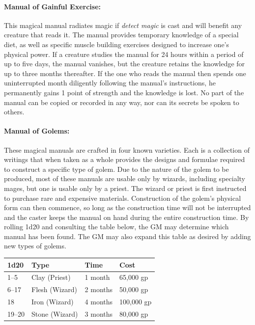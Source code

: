 \begin{multicols}{2}
\paragraph{Manual of Gainful Exercise:} This magical manual radiates magic if \textit{detect magic} is cast and will benefit any creature that reads it.  The manual provides temporary knowledge of a special diet, as well as specific muscle building exercises designed to increase one's physical power.  If a creature studies the manual for 24 hours within a period of up to five days, the manual vanishes, but the creature retains the knowledge for up to three months thereafter.  If the one who reads the manual then spends one uninterrupted month diligently following the manual's instructions, he permanently gains 1 point of strength and the knowledge is lost.  No part of the manual can be copied or recorded in any way, nor can its secrets be spoken to others.  

\paragraph{Manual of Golems:} These magical manuals are crafted in four known varieties.  Each is a collection of writings that when taken as a whole provides the designs and formulae required to construct a specific type of golem.  Due to the nature of the golem to be produced, most of these manuals are usable only by wizards, including specialty mages, but one is usable only by a priest.  The wizard or priest is first instructed to purchase rare and expensive materials.  Construction of the golem's physical form can then commence, so long as the construction time will not be interrupted and the caster keeps the manual on hand during the entire construction time.  By rolling 1d20 and consulting the table below, the GM may determine which manual has been found.  The GM may also expand this table as desired by adding new types of golems.
 
\noindent
\begin{tabular}{|p{}|p{}|p{}|p{}|}
\hline
1d20	& Type	& Time	& Cost \\
\hline\hline
\rowcolor[gray]{.9}1--5	& Clay (Priest)	& 1 month	& 65,000 gp \\
6--17	& Flesh (Wizard)	& 2 months	& 50,000 gp \\
\rowcolor[gray]{.9}18	& Iron (Wizard)	& 4 months	& 100,000 gp \\
19--20	& Stone (Wizard)	& 3 months	& 80,000 gp \\
\hline
\end{tabular}


\end{multicols}
